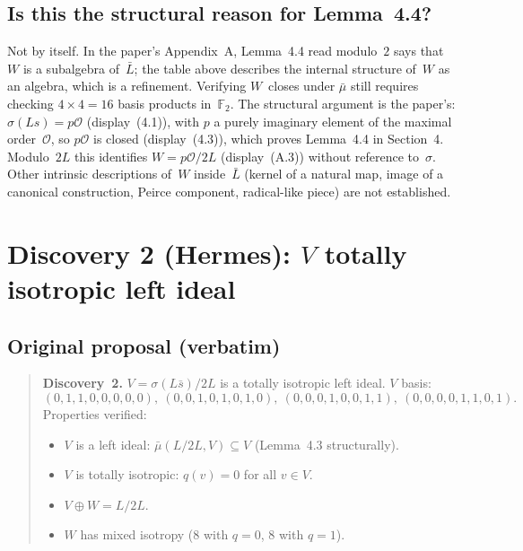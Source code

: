 \documentclass[11pt]{amsart}
\newcommand{\FF}{\mathbb{F}}
\begin{document}
\subsection*{Is this the structural reason for Lemma~4.4?}

Not by itself. In the paper's Appendix~A, Lemma~4.4 read modulo~$2$
says that $W$ is a subalgebra of~$\bar L$; the table above describes the
internal structure of~$W$ as an algebra, which is a refinement.
Verifying $W$~closes under $\bar\mu$ still requires checking
$4 \times 4 = 16$ basis products in~$\FF_2$. The structural argument is
the paper's: $\sigma(Ls) = p\mathcal O$ (display~(4.1)), with $p$ a
purely imaginary element of the maximal order~$\mathcal O$, so
$p\mathcal O$ is closed (display~(4.3)), which proves Lemma~4.4 in
Section~4. Modulo~$2L$ this identifies $W = p\mathcal O/2L$
(display~(A.3)) without reference to~$\sigma$. Other intrinsic
descriptions of~$W$ inside~$\bar L$ (kernel of a natural map, image of a
canonical construction, Peirce component, radical-like piece) are not
established.

\section{Discovery 2 (Hermes): $V$ totally isotropic left ideal}

\subsection*{Original proposal (verbatim)}

\begin{quote}
\textbf{Discovery~2.}  $V = \sigma(L\bar s)/2L$ is a totally isotropic
left ideal. $V$ basis:
\[ (0,1,1,0,0,0,0,0),\ (0,0,1,0,1,0,1,0),\ (0,0,0,1,0,0,1,1),\
   (0,0,0,0,1,1,0,1). \]
Properties verified:
\begin{itemize}
\item $V$ is a left ideal: $\bar\mu(L/2L, V) \subseteq V$
  (Lemma~4.3 structurally).
\item $V$ is totally isotropic: $q(v) = 0$ for all $v \in V$.
\item $V \oplus W = L/2L$.
\item $W$ has mixed isotropy ($8$ with $q=0$, $8$ with $q=1$).
\end{itemize}
\end{quote}
\end{document}
